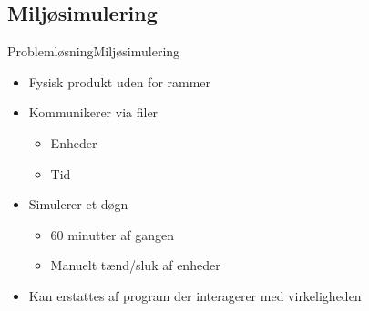 \subsection{Miljøsimulering}
\begin{frame}{Problemløsning}{Miljøsimulering}
\begin{itemize}
	\item Fysisk produkt uden for rammer
	\item Kommunikerer via filer
	\begin{itemize}
		\item Enheder
		\item Tid
	\end{itemize}
	\item Simulerer et døgn
	\begin{itemize}
		\item 60 minutter af gangen
		\item Manuelt tænd/sluk af enheder
	\end{itemize}
	\item Kan erstattes af program der interagerer med virkeligheden
\end{itemize}
\end{frame}
